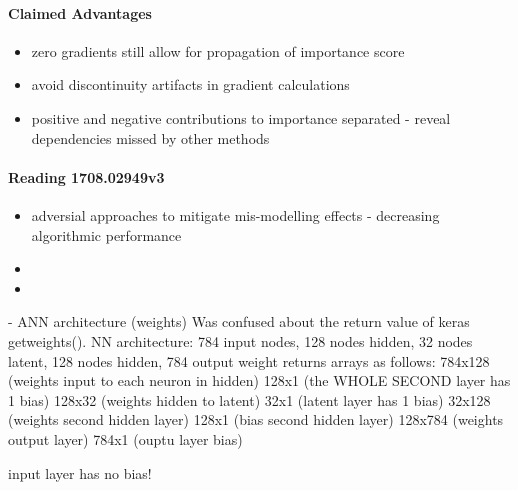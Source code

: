 \paragraph{Claimed Advantages}
\begin{itemize}
  \item zero gradients still allow for propagation of importance score
  \item avoid discontinuity artifacts in gradient calculations
  \item positive and negative contributions to importance separated - reveal dependencies missed by other methods 
\end{itemize}



\paragraph{Reading 1708.02949v3}
\begin{itemize}
  \item adversial approaches to mitigate mis-modelling effects - decreasing algorithmic performance
  \item 
  \item 
\end{itemize}


- ANN architecture (weights)
Was confused about the return value of keras getweights(). 
NN architecture: 784 input nodes, 128 nodes hidden, 32 nodes latent, 128 nodes
hidden, 784 output
weight returns arrays as follows: 
784x128 (weights input to each neuron in hidden)
128x1 (the WHOLE SECOND layer has 1 bias)
128x32 (weights hidden to latent)
32x1 (latent layer has 1 bias)
32x128 (weights second hidden layer)
128x1 (bias second hidden layer)
128x784 (weights output layer)
784x1 (ouptu layer bias)

input layer has no bias!

